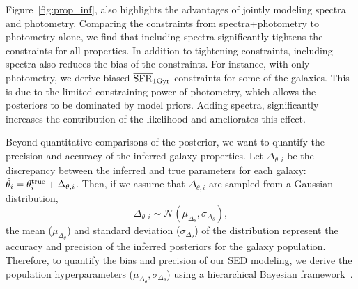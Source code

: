 Figure~\ref{fig:prop_inf}, also highlights the advantages of jointly modeling
spectra and photometry. 
Comparing the constraints from spectra+photometry to photometry alone, we find
that including spectra significantly tightens the constraints for all
properties. 
In addition to tightening constraints, including spectra also reduces the bias
of the constraints. 
For instance, with only photometry, we derive biased $\overline{\rm SFR}_{\rm 1Gyr}$ constraints for
some of the galaxies. 
This is due to the limited constraining power of photometry, which allows the
posteriors to be dominated by model priors. 
Adding spectra, significantly increases the contribution of the likelihood and
ameliorates this effect. 

Beyond quantitative comparisons of the posterior, we want to quantify the
precision and accuracy of the inferred galaxy properties. 
Let $\Delta_{\theta,i}$ be the discrepancy between the inferred and true
parameters for each galaxy: $\hat{\theta}_i = \theta^{\rm true}_i +
\Delta_{\theta,i}$.
Then, if we assume that $\Delta_{\theta,i}$ are sampled from a Gaussian
distribution,
\begin{equation} \label{eq:eta_gauss}
    \Delta_{\theta,i} \sim \mathcal{N}(\mu_{\Delta_{\theta}}, \sigma_{\Delta_{\theta}}),
\end{equation}
the mean ($\mu_{\Delta_{\theta}}$) and standard deviation
($\sigma_{\Delta_{\theta}}$) of the distribution represent the accuracy and
precision of the inferred posteriors for the galaxy population. 
Therefore, to quantify the bias and precision of our SED modeling, we derive the 
population hyperparameters ($\mu_{\Delta_{\theta}}, \sigma_{\Delta_{\theta}}$)
using a hierarchical Bayesian framework~\citep[\emph{e.g.}][]{hogg2010,
foreman-mackey2014, baronchelli2020}.


